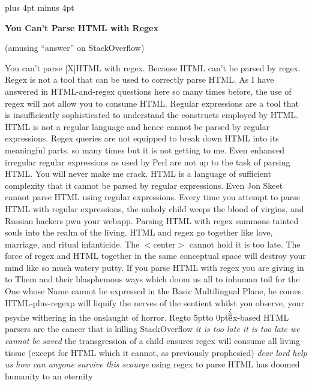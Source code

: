 \parskip 10pt plus 4pt minus 4pt\parindent=0pt%
\centerline{\bf You Can't Parse HTML with Regex}
\centerline{(amusing ``answer'' on StackOverflow)}

\bigskip

You can't parse [X]HTML with regex. Because HTML can't be parsed by
regex. Regex is not a tool that can be used to correctly parse
HTML. As I have answered in HTML-and-regex questions here so many
times before, the use of regex will not allow you to consume
HTML. Regular expressions are a tool that is insufficiently
sophisticated to understand the constructs employed by HTML. HTML is
not a regular language and hence cannot be parsed by regular
expressions. Regex queries are not equipped to break down HTML into
its meaningful parts. so many times but it is not getting to me. Even
enhanced irregular regular expressions as used by Perl are not up to
the task of parsing HTML. You will never make me crack. HTML is a
language of sufficient complexity that it cannot be parsed by regular
expressions. Even Jon Skeet cannot parse HTML using regular
expressions. Every time you attempt to parse HTML with regular
expressions, the unholy child weeps the blood of virgins, and Russian
hackers pwn your webapp. Parsing HTML with regex summons tainted souls
into the realm of the living. HTML and regex go together like love,
marriage, and ritual infanticide. The $<$center$>$ cannot hold it is too
late. The force of regex and HTML together in the same conceptual
space will destroy your mind like so much watery putty. If you parse
HTML with regex you are giving in to Them and their blasphemous ways
which doom us all to inhuman toil for the One whose Name cannot be
expressed in the Basic Multilingual Plane, he comes. HTML-plus-regexp
will liquify the nerves of the sentient whilst you observe, your
psyche withering in the onslaught of horror.
Reg\raise 10pt\hbox to 5pt{\vbox to 0pt{$\acute{\grave{\overline{\overline{\rm e}}}}$}}x-based 
HTML parsers are the cancer that is killing StackOverflow
{\it it is too late it is too
late we cannot be saved} the transgression of a
chil\llap{\raise 7pt\hbox{$\frown$}}d
ensures regex
will consume all living tissue (except for HTML which it cannot, as
previously prophesied)
{\it dear lord help us how can anyone survive this
scourge} using regex to parse HTML has doomed humanity to an eternity
